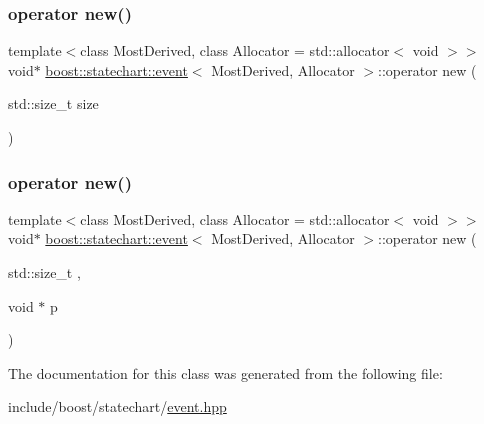 \mbox{\label{classboost_1_1statechart_1_1event_a53303aa51b8185e92cdd296ddef99317}} 
\subsubsection{\texorpdfstring{operator new()}{operator new()}\hspace{0.1cm}{\footnotesize\ttfamily [1/2]}}
{\footnotesize\ttfamily template$<$class Most\+Derived, class Allocator = std\+::allocator$<$ void $>$$>$ \\
void$\ast$ \mbox{\hyperlink{classboost_1_1statechart_1_1event}{boost\+::statechart\+::event}}$<$ Most\+Derived, Allocator $>$\+::operator new (\begin{DoxyParamCaption}\item[{std\+::size\+\_\+t}]{size }\end{DoxyParamCaption})\hspace{0.3cm}{\ttfamily [inline]}}

\mbox{\label{classboost_1_1statechart_1_1event_a5a96b4dd856bbb827654fcec0924569c}} 
\subsubsection{\texorpdfstring{operator new()}{operator new()}\hspace{0.1cm}{\footnotesize\ttfamily [2/2]}}
{\footnotesize\ttfamily template$<$class Most\+Derived, class Allocator = std\+::allocator$<$ void $>$$>$ \\
void$\ast$ \mbox{\hyperlink{classboost_1_1statechart_1_1event}{boost\+::statechart\+::event}}$<$ Most\+Derived, Allocator $>$\+::operator new (\begin{DoxyParamCaption}\item[{std\+::size\+\_\+t}]{,  }\item[{void $\ast$}]{p }\end{DoxyParamCaption})\hspace{0.3cm}{\ttfamily [inline]}}



The documentation for this class was generated from the following file\+:\begin{DoxyCompactItemize}
\item 
include/boost/statechart/\mbox{\hyperlink{event_8hpp}{event.\+hpp}}\end{DoxyCompactItemize}
